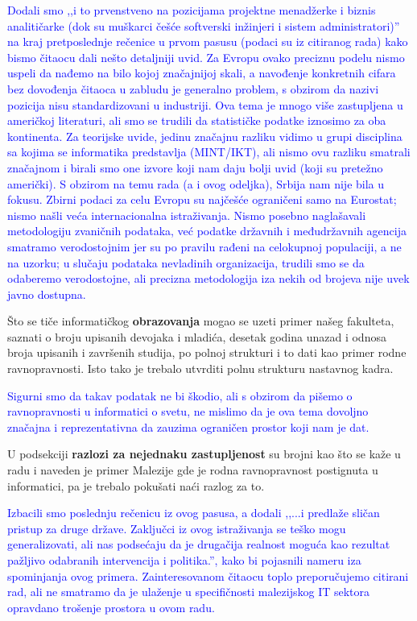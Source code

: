 \documentclass[a4paper]{report}
\newcommand{\odgovor}[1]{\textcolor{blue}{#1}}
\begin{document}
\odgovor{Dodali smo ,,i to prvenstveno na pozicijama projektne menadžerke i biznis analitičarke (dok su muškarci češće softverski inžinjeri i sistem administratori)'' na kraj pretposlednje rečenice u prvom pasusu (podaci su iz citiranog rada) kako bismo čitaocu dali nešto detaljniji uvid. Za Evropu ovako preciznu podelu nismo uspeli da nađemo na bilo kojoj značajnijoj skali, a navođenje konkretnih cifara bez dovođenja čitaoca u zabludu je generalno problem, s obzirom da nazivi pozicija nisu standardizovani u industriji. Ova tema je mnogo više zastupljena u američkoj literaturi, ali smo se trudili da statističke podatke iznosimo za oba kontinenta. Za teorijske uvide, jedinu značajnu razliku vidimo u grupi disciplina sa kojima se informatika predstavlja (MINT/IKT), ali nismo ovu razliku smatrali značajnom i birali smo one izvore koji nam daju bolji uvid (koji su pretežno američki). S obzirom na temu rada (a i ovog odeljka), Srbija nam nije bila u fokusu. Zbirni podaci za celu Evropu su najčešće ograničeni samo na Eurostat; nismo našli veća internacionalna istraživanja. Nismo posebno naglašavali metodologiju zvaničnih podataka, već podatke državnih i međudržavnih agencija smatramo verodostojnim jer su po pravilu rađeni na celokupnoj populaciji, a ne na uzorku; u slučaju podataka nevladinih organizacija, trudili smo se da odaberemo verodostojne, ali precizna metodologija iza nekih od brojeva nije uvek javno dostupna.}

Što se tiče informatičkog \textbf{obrazovanja} mogao se uzeti primer našeg fakulteta, saznati o broju upisanih devojaka i mladića, desetak godina unazad i odnosa broja upisanih i završenih studija, po polnoj strukturi i to dati kao primer rodne ravnopravnosti. Isto tako je trebalo utvrditi polnu strukturu nastavnog kadra.

\odgovor{Sigurni smo da takav podatak ne bi škodio, ali s obzirom da pišemo o ravnopravnosti u informatici o svetu, ne mislimo da je ova tema dovoljno značajna i reprezentativna da zauzima ograničen prostor koji nam je dat.}

U podsekciji \textbf{razlozi za nejednaku zastupljenost} su brojni kao što se kaže u radu i naveden je primer Malezije gde je rodna ravnopravnost postignuta u informatici, pa je trebalo pokušati naći razlog za to.

\odgovor{Izbacili smo poslednju rečenicu iz ovog pasusa, a dodali ,,...i predlaže sličan pristup za druge države. Zaključci iz ovog istraživanja se teško mogu generalizovati, ali nas podsećaju da je drugačija realnost moguća kao rezultat pažljivo odabranih intervencija i politika.'', kako bi pojasnili nameru iza spominjanja ovog primera. Zainteresovanom čitaocu toplo preporučujemo citirani rad, ali ne smatramo da je ulaženje u specifičnosti malezijskog IT sektora opravdano trošenje prostora u ovom radu.}
\end{document}
